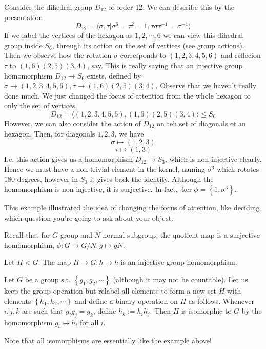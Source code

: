 \begin{example}
  Consider the dihedral group $D_{12}$ of order 12. We can describe this by the
  presentation
  \[D_{12}=\langle \sigma, \tau | \sigma^{6}=\tau^2=1, \tau\sigma\tau^{-1} =
  \sigma^{-1}\rangle\]
  If we label the vertices of the hexagon as $1,2,\cdots,6$ we can view this dihedral
  group inside $S_6$, through its action on the set of vertices (see group actions). Then
  we observe how the rotation $\sigma$ corresponds to $(1,2,3,4,5,6)$ and reflecion
  $\tau$ to $(1,6)(2,5)(3,4)$, say. This is really saying that an injective group
  homomorphism $D_{12}\to S_6$ exists, defined by $\sigma\to (1,2,3,4,5,6), \tau\to
  (1,6)(2,5)(3,4)$. Observe that we haven't really done much. We just changed the focus of
  attention from the whole hexagon to only the set of vertices,
  \[D_{12}=\langle (1,2,3,4,5,6),(1,6)(2,5)(3,4)\rangle \leq S_6\]
  However, we can also consider the action of $D_12$ on teh set of diagonals of an
  hexagon. Then, for diagonals $1,2,3$, we have 
  \[\sigma\mapsto (1,2,3)\]
  \[\tau\mapsto (1,3)\]
  I.e. this action gives us a homomorphism $D_{12}\to S_3$, which is non-injective
  clearly. Hence we must have a non-trivial element in the kernel, naming $\sigma^3$ which
  rotates $180$ degrees, however in $S_3$ it gives back the identity. Although the
  homomorphism is non-injective, it is surjective. In fact, $\ker\phi = \left\{ 1,\sigma^3
  \right\}$.
\end{example}
This example illustrated the idea of changing the focus of attention, like deciding which
question you're going to ask about your object.

\begin{example} 
  Recall that for $G$ group and $N$ normal subgroup, the quotient map is a surjective
  homomorphism, $\phi:G\to G/N : g\mapsto gN$.

  Let $H< G$. The map $H\to G:h\mapsto h$ is an injective group homomorphism.
\end{example}

\begin{example}
  Let $G$ be a group s.t. $\left\{ g_1,g_2,\cdots\right\}$ (although it may not be
  countable). Let us keep the group operation but relabel all elements to form a new set
  $H$ with elements $\left\{ h_1,h_2,\cdots \right\}$ and define a binary operation on $H$
  as follows. Whenever $i,j,k$ are such that $g_ig_j=g_k$, define $h_k:=h_ih_j$. Then $H$
  is isomorphic to $G$ by the homomorphism $g_i\mapsto h_i$ for all $i$.
\end{example}
Note that all isomorphisms are essentially like the example above!

